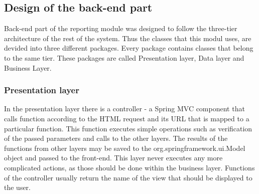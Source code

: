 \documentclass[thesis=B,english]{FITthesis}[2012/10/20]
\begin{document}


\subsection{Design of the back-end part}
Back-end part of the reporting module was designed to follow the three-tier architecture of the rest of the system. Thus the classes that this modul uses, are devided into three different packages. Every package contains classes that belong to the same tier. These packages are called Presentation layer, Data layer and Business Layer.

\subsubsection{Presentation layer}
In the presentation layer there is a controller - a Spring MVC component that calls function according to the  HTML request and its URL that is mapped to a particular function. This function executes simple operations such as verification of the passed parameters and calls to the other layers. The results of the functions from other layers may be saved to the org.springframework.ui.Model object and passed to the front-end. This layer never executes any more complicated actions, as those should be done within the business layer. Functions of the controller usually return the name of the view that should be displayed to the user.
\end{document}
